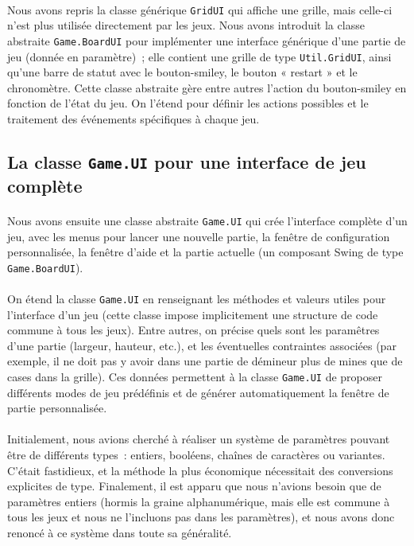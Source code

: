 \documentclass[a4paper]{article}
\newcommand\ttt\texttt
\begin{document}
	\paragraph{}
	Nous avons repris la classe générique \ttt{GridUI} qui affiche une grille,
	mais celle-ci n’est plus utilisée directement par les jeux. Nous avons
	introduit la classe abstraite \ttt{Game.BoardUI} pour implémenter une
	interface générique d’une partie de jeu (donnée en paramètre)~; elle
	contient une grille de type \ttt{Util.GridUI}, ainsi qu’une barre de statut
	avec le bouton-smiley, le bouton « restart » et le chronomètre. Cette classe
	abstraite gère entre autres l’action du bouton-smiley en fonction de l’état
	du jeu. On l’étend pour définir les actions possibles et le traitement des
	événements spécifiques à chaque jeu.

	\subsection{La classe \ttt{Game.UI} pour une interface de jeu complète}

	\paragraph{}
	Nous avons ensuite une classe abstraite \ttt{Game.UI} qui crée l’interface
	complète d’un jeu, avec les menus pour lancer une nouvelle partie, la
	fenêtre de configuration personnalisée, la fenêtre d’aide et la partie
	actuelle (un composant Swing de type \ttt{Game.BoardUI}).

	\paragraph{}
	On étend la classe \ttt{Game.UI} en renseignant les méthodes et valeurs
	utiles pour l’interface d’un jeu (cette classe impose implicitement une
	structure de code commune à tous les jeux). Entre autres, on précise quels
	sont les paramêtres d’une partie (largeur, hauteur, etc.), et les
	éventuelles contraintes associées (par exemple, il ne doit pas y avoir dans
	une partie de démineur plus de mines que de cases dans la grille). Ces
	données permettent à la classe \ttt{Game.UI} de proposer différents modes de
	jeu prédéfinis et de générer automatiquement la fenêtre de partie
	personnalisée.

	\paragraph{}
	Initialement, nous avions cherché à réaliser un système de paramètres
	pouvant être de différents types~: entiers, booléens, chaînes de caractères
	ou variantes. C’était fastidieux, et la méthode la plus économique
	nécessitait des conversions explicites de type. Finalement, il est apparu
	que nous n’avions besoin que de paramètres entiers (hormis la graine
	alphanumérique, mais elle est commune à tous les jeux et nous ne l’incluons
	pas dans les paramètres), et nous avons donc renoncé à ce système dans toute
	sa généralité.
\end{document}
